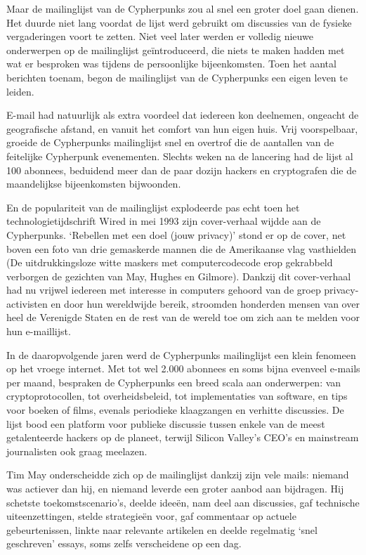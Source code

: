 \documentclass[smalldemyvopaper,11pt,twoside,onecolumn,openright,extrafontsizes,hidelinks]{memoir}
\begin{document}
Maar de mailinglijst van de Cypherpunks zou al snel een groter doel gaan
dienen. Het duurde niet lang voordat de lijst werd gebruikt om
discussies van de fysieke vergaderingen voort te zetten. Niet veel later
werden er volledig nieuwe onderwerpen op de mailinglijst geïntroduceerd,
die niets te maken hadden met wat er besproken was tijdens de
persoonlijke bijeenkomsten. Toen het aantal berichten toenam, begon de
mailinglijst van de Cypherpunks een eigen leven te leiden.

E-mail had natuurlijk als extra voordeel dat iedereen kon deelnemen,
ongeacht de geografische afstand, en vanuit het comfort van hun eigen
huis. Vrij voorspelbaar, groeide de Cypherpunks mailinglijst snel en
overtrof die de aantallen van de feitelijke Cypherpunk evenementen.
Slechts weken na de lancering had de lijst al 100 abonnees, beduidend
meer dan de paar dozijn hackers en cryptografen die de maandelijkse
bijeenkomsten bijwoonden.

En de populariteit van de mailinglijst explodeerde pas echt toen het
technologietijdschrift Wired in mei 1993 zijn cover-verhaal wijdde aan
de Cypherpunks. `Rebellen met een doel (jouw privacy)' stond er op de
cover, net boven een foto van drie gemaskerde mannen die de Amerikaanse
vlag vasthielden (De uitdrukkingsloze witte maskers met computercodecode
erop gekrabbeld verborgen de gezichten van May, Hughes en Gilmore).
Dankzij dit cover-verhaal had nu vrijwel iedereen met interesse in
computers gehoord van de groep privacy-activisten en door hun
wereldwijde bereik, stroomden honderden mensen van over heel de
Verenigde Staten en de rest van de wereld toe om zich aan te melden voor
hun e-maillijst.

In de daaropvolgende jaren werd de Cypherpunks mailinglijst een klein
fenomeen op het vroege internet. Met tot wel 2.000 abonnees en soms
bijna evenveel e-mails per maand, bespraken de Cypherpunks een breed
scala aan onderwerpen: van cryptoprotocollen, tot overheidsbeleid, tot
implementaties van software, en tips voor boeken of films, evenals
periodieke klaagzangen en verhitte discussies. De lijst bood een
platform voor publieke discussie tussen enkele van de meest
getalenteerde hackers op de planeet, terwijl Silicon Valley's CEO's en
mainstream journalisten ook graag meelazen.

Tim May onderscheidde zich op de mailinglijst dankzij zijn vele mails:
niemand was actiever dan hij, en niemand leverde een groter aanbod aan
bijdragen. Hij schetste toekomstscenario's, deelde ideeën, nam deel aan
discussies, gaf technische uiteenzettingen, stelde strategieën voor, gaf
commentaar op actuele gebeurtenissen, linkte naar relevante artikelen en
deelde regelmatig `snel geschreven' essays, soms zelfs verscheidene op
een dag.
\end{document}
